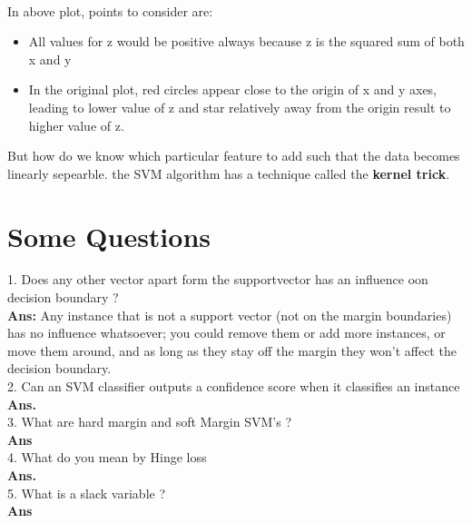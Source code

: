 \documentclass[a4paper, 11pt]{article}
\begin{document}
\\ In above plot, points to consider are:
\begin{itemize}
\item All values for z would be positive always because z is the squared sum of both x and y
\item In the original plot, red circles appear close to the origin of x and y axes, leading to lower value of z and star relatively away from the origin result to higher value of z.
\end{itemize}
But how do we know which particular feature to add such that the data becomes linearly sepearble. the SVM  algorithm has a technique called the \textbf{kernel trick}.
\section{Some Questions}
1. Does any other vector apart form the supportvector has an influence oon decision boundary ?\\
\textbf{Ans:} Any instance that is not a support vector (not on the margin boundaries) has no influence whatsoever;
you could remove them or add more instances, or move them around, and as long as they stay off the
margin they won’t affect the decision boundary.\\
2. Can an SVM classifier outputs a confidence score when it classifies an
instance\\
\textbf{Ans.} \\
3. What are hard margin and soft Margin SVM's ?\\ 
\textbf{Ans} \\
4. What do you mean by Hinge loss \\
\textbf{Ans.}  \\         
5. What is a slack variable ?\\
\textbf{Ans} \\

\end{document}
